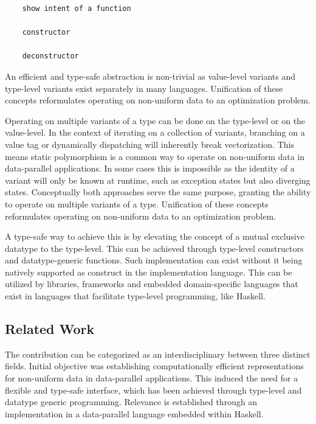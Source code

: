 \documentclass{article}
\begin{document}
\begin{verbatim}
    show intent of a function

    constructor

    deconstructor
\end{verbatim}

An efficient and type-safe abstraction is non-trivial as value-level variants and type-level variants exist separately in many languages.  
Unification of these concepts reformulates operating on non-uniform data to an optimization problem.

Operating on multiple variants of a type can be done on the type-level or on the value-level.
In the context of iterating on a collection of variants, branching on a value tag or dynamically dispatching will inherently break vectorization.
This means static polymorphism is a common way to operate on non-uniform data in data-parallel applications.
In some cases this is impossible as the identity of a variant will only be known at runtime, such as exception states but also diverging states.
Conceptually both approaches serve the same purpose, granting the ability to operate on multiple variants of a type.
Unification of these concepts reformulates operating on non-uniform data to an optimization problem.

A type-safe way to achieve this is by elevating the concept of a mutual exclusive datatype to the type-level.
This can be achieved through type-level constructors and datatype-generic functions.
Such implementation can exist without it being natively supported as construct in the implementation language.
This can be utilized by libraries, frameworks and embedded domain-specific languages that exist in languages that facilitate type-level programming, like Haskell.

\newpage

\subsection{Related Work}

The contribution can be categorized as an interdisciplinary between three distinct fields.
Initial objective was establishing computationally efficient representations for non-uniform data in data-parallel applications.
This induced the need for a flexible and type-safe interface, which has been achieved through type-level and datatype generic programming.
Relevance is established through an implementation in a data-parallel language embedded within Haskell.
\end{document}
